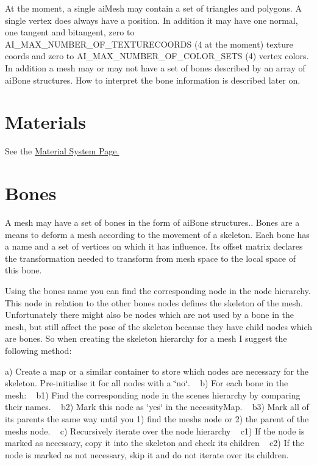 At the moment, a single ai\+Mesh may contain a set of triangles and polygons. A single vertex does always have a position. In addition it may have one normal, one tangent and bitangent, zero to A\+I\+\_\+\+M\+A\+X\+\_\+\+N\+U\+M\+B\+E\+R\+\_\+\+O\+F\+\_\+\+T\+E\+X\+T\+U\+R\+E\+C\+O\+O\+R\+D\+S (4 at the moment) texture coords and zero to A\+I\+\_\+\+M\+A\+X\+\_\+\+N\+U\+M\+B\+E\+R\+\_\+\+O\+F\+\_\+\+C\+O\+L\+O\+R\+\_\+\+S\+E\+T\+S (4) vertex colors. In addition a mesh may or may not have a set of bones described by an array of ai\+Bone structures. How to interpret the bone information is described later on.\hypertarget{importer_notes_material}{}\section{Materials}\label{importer_notes_material}
See the \hyperlink{materials}{Material System Page. }\hypertarget{data_bones}{}\section{Bones}\label{data_bones}
A mesh may have a set of bones in the form of ai\+Bone structures.. Bones are a means to deform a mesh according to the movement of a skeleton. Each bone has a name and a set of vertices on which it has influence. Its offset matrix declares the transformation needed to transform from mesh space to the local space of this bone.

Using the bones name you can find the corresponding node in the node hierarchy. This node in relation to the other bones\textquotesingle{} nodes defines the skeleton of the mesh. Unfortunately there might also be nodes which are not used by a bone in the mesh, but still affect the pose of the skeleton because they have child nodes which are bones. So when creating the skeleton hierarchy for a mesh I suggest the following method\+:

a) Create a map or a similar container to store which nodes are necessary for the skeleton. Pre-\/initialise it for all nodes with a \char`\"{}no\char`\"{}. ~\newline
 b) For each bone in the mesh\+: ~\newline
 b1) Find the corresponding node in the scene\textquotesingle{}s hierarchy by comparing their names. ~\newline
 b2) Mark this node as \char`\"{}yes\char`\"{} in the necessity\+Map. ~\newline
 b3) Mark all of its parents the same way until you 1) find the mesh\textquotesingle{}s node or 2) the parent of the mesh\textquotesingle{}s node. ~\newline
 c) Recursively iterate over the node hierarchy ~\newline
 c1) If the node is marked as necessary, copy it into the skeleton and check its children ~\newline
 c2) If the node is marked as not necessary, skip it and do not iterate over its children. ~\newline


